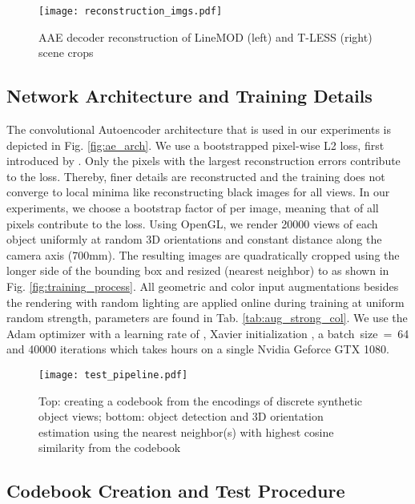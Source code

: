 \begin{figure}[t]\centering
	
	\centering
	\captionsetup{width=0.95\columnwidth}
	\texttt{[image: reconstruction\_imgs.pdf]}
	\caption{\gls{AAE} decoder reconstruction of LineMOD (left) and T-LESS (right) scene crops}
	\label{fig:reconst_ex}
	
\end{figure}
\subsection{Network Architecture and Training Details}

The convolutional Autoencoder architecture that is used in our experiments is depicted in Fig. \ref{fig:ae_arch}. 
We use a bootstrapped pixel-wise L2 loss, first introduced by \cite{wu2016bridging}. Only the pixels with the largest reconstruction errors contribute to the loss. Thereby, finer details are reconstructed and the training does not converge to local minima like reconstructing black images for all views. In our experiments, we choose a bootstrap factor of  per image, meaning that  of all pixels contribute to the loss.
Using OpenGL, we render 20000 views of each object uniformly at random 3D orientations and constant distance along the camera axis (700mm). The resulting images are quadratically cropped using the longer side of the bounding box and resized (nearest neighbor) to  as shown in Fig. \ref{fig:training_process}. All geometric and color input augmentations besides the rendering with random lighting are applied online during training at uniform random strength, parameters are found in Tab. \ref{tab:aug_strong_col}.
We use the Adam \citep{kingma2014adam} optimizer with a learning rate of , Xavier initialization \citep{glorot2010understanding}, a \mbox{batch size = 64} and 40000 iterations which takes  hours on a single Nvidia Geforce GTX 1080.
\begin{figure*}[t]\centering
	\captionsetup{width=0.93\textwidth}
	\texttt{[image: test\_pipeline.pdf]}
	\caption{Top: creating a codebook from the encodings of discrete synthetic object views; bottom: object detection and 3D orientation estimation using the nearest neighbor(s) with highest cosine similarity from the codebook}
	\label{fig:test_pipeline}
\end{figure*}
\subsection{Codebook Creation and Test Procedure}



